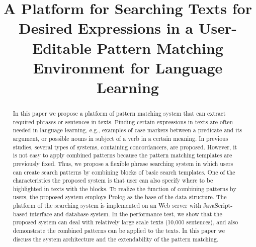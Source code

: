 \documentclass[conference]{IEEEtran}
\begin{document}
\title{A Platform for Searching Texts for Desired Expressions in a User-Editable Pattern Matching Environment for Language Learning\\
}

\author{
  \and
}



\maketitle

\begin{abstract}
  In this paper we propose a platform of pattern matching system that can extract required phrases or sentences in texts.
  Finding certain expressions in texts are often needed in language learning, e.g., examples of case markers
  between a predicate and its argument, or possible nouns in subject of a verb in a certain meaning. In previous studies,
  several types of systems, containing concordancers, are proposed. However, it is not easy to apply combined
  patterns because the pattern matching templates are previously fixed.
  Thus, we propose a flexible phrase searching system in which users can create search patterns
  by combining blocks of basic search templates. %
  One of the characteristics the proposed system is that user can also specify where to be highlighted
  in texts with the blocks.
  To realize the function of combining patterns by users, the proposed system employs
  Prolog as the base of the data structure. The platform of the searching system is implemented
  on an Web server with JavaScript-based interface and database system.
  In the performance test, we show that the proposed system can deal with relatively large scale texts
  (10,000 sentences), and also demonstrate the combined patterns can be applied to the texts.
  In this paper we discuss the system architecture and the extendability of the pattern matching.
\end{abstract}
\end{document}
